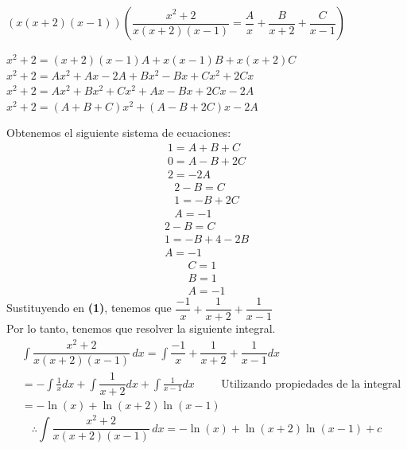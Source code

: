 \documentclass[letterpaper]{article}
\renewcommand{\*}{\cdot}
\theoremstyle{definition}
\begin{document}
\begin{enumerate}
\begin{enumerate}
\begin{center}
\end{center}
\begin{center}
	$(x(x+2)(x-1))(\dfrac{x^2 +2}{x(x+2)(x-1)}=\dfrac{A}{x}+\dfrac{B}{x+2}+\dfrac{C}{x-1})$
\end{center}
\begin{center}
	$x^{2}+2= (x+2)(x-1)A+x(x-1)B+x(x+2)C$\\
	$x^{2}+2= Ax^{2}+Ax-2A+Bx^{2}-Bx+Cx^{2}+2Cx$\\
	$x^{2}+2=Ax^{2}+Bx^{2}+Cx^{2}+Ax-Bx+2Cx-2A$\\
	$x^{2}+2=(A+B+C)x^{2}+(A-B+2C)x-2A$
	\end{center}
Obtenemos el siguiente sistema de ecuaciones:
\begin{align*}
	1=A+B+C\\
	0=A-B+2C\\
	2=-2A
\end{align*}
\begin{align*}
	2-B = C\\
	1=-B+2C\\
	A=-1
\end{align*}
\begin{align*}
	2-B=C\\
	1=-B+4-2B\\
	A=-1
\end{align*}
\begin{align*}
	C=1\\
	B=1\\
	A=-1
\end{align*}
Sustituyendo en \textbf{(1)}, tenemos que $\dfrac{-1}{x}+\dfrac{1}{x+2}+\dfrac{1}{x-1}$\\
Por lo tanto, tenemos que resolver la siguiente integral.
\begin{align*}
	&\int \dfrac{x^2 +2}{x(x+2)(x-1)} \, dx= \int \dfrac{-1}{x}+\dfrac{1}{x+2}+\dfrac{1}{x-1}dx\\
	&= -\int \frac{1}{x}dx+\int \dfrac{1}{x+2}dx +\int \frac{1}{x-1}dx \hspace{1cm} \text{Utilizando propiedades de la integral}\\
	&= -\ln(x)+\ln(x+2)\ln(x-1)
\end{align*}
\[\therefore  \int \dfrac{x^2 +2}{x(x+2)(x-1)} \, dx = -\ln(x)+\ln(x+2)\ln(x-1)+c\]


\end{enumerate}
\end{enumerate}
\end{document}
